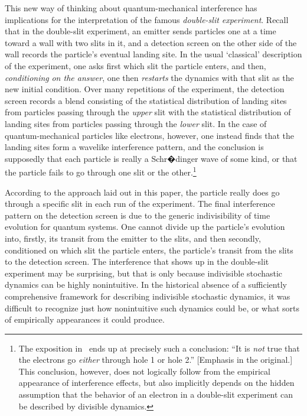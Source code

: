 \documentclass[12pt,english,prl,superscriptaddress,nobibnotes,nofootinbib]{revtex4-2}
\begin{document}
This new way of thinking about quantum-mechanical interference has
implications for the interpretation of the famous \emph{double-slit experiment}.
Recall that in the double-slit experiment, an emitter sends particles
one at a time toward a wall with two slits in it, and a detection
screen on the other side of the wall records the particle's eventual
landing site. In the usual \textquoteleft classical\textquoteright{}
description of the experiment, one asks first which slit the particle
enters, and then, \emph{conditioning} \emph{on the answer}, one then
\emph{restarts} the dynamics with that slit as the new initial condition.
Over many repetitions of the experiment, the detection screen records
a blend consisting of the statistical distribution of landing sites
from particles passing through the \emph{upper} slit with the statistical
distribution of landing sites from particles passing through the \emph{lower}
slit. In the case of quantum-mechanical particles like electrons,
however, one instead finds that the landing sites form a wavelike
interference pattern, and the conclusion is supposedly that each particle
is really a Schr�dinger wave of some kind, or that the particle fails
to go through one slit or the other.\footnote{The exposition in~\citep{FeynmanLeightonSands:1965tflopv3} ends
up at precisely such a conclusion: ``It is \emph{not} true that the
electrons go \emph{either} through hole 1 or hole 2.'' {[}Emphasis
in the original.{]} This conclusion, however, does not logically follow
from the empirical appearance of interference effects, but also implicitly
depends on the hidden assumption that the behavior of an electron
in a double-slit experiment can be described by divisible dynamics.}

According to the approach laid out in this paper, the particle really
does go through a specific slit in each run of the experiment. The
final interference pattern on the detection screen is due to the generic
indivisibility of time evolution for quantum systems. One cannot divide
up the particle's evolution into, firstly, its transit from the emitter
to the slits, and then secondly, conditioned on which slit the particle
enters, the particle's transit from the slits to the detection screen.
The interference that shows up in the double-slit experiment may be
surprising, but that is only because indivisible stochastic dynamics
can be highly nonintuitive. In the historical absence of a sufficiently
comprehensive framework for describing indivisible stochastic dynamics,
it was difficult to recognize just how nonintuitive such dynamics
could be, or what sorts of empirically appearances it could produce.
\end{document}
